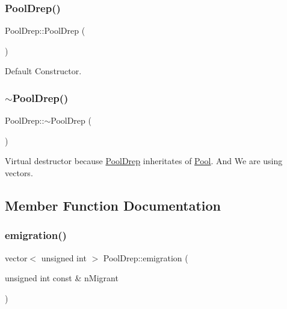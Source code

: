 \subsubsection{\texorpdfstring{Pool\+Drep()}{PoolDrep()}\hspace{0.1cm}{\footnotesize\ttfamily [2/2]}}
{\footnotesize\ttfamily Pool\+Drep\+::\+Pool\+Drep (\begin{DoxyParamCaption}{ }\end{DoxyParamCaption})\hspace{0.3cm}{\ttfamily [default]}}



Default Constructor. 

\hypertarget{class_pool_drep_a06de6a1171890c9902e1f5e20cd10523}{}\label{class_pool_drep_a06de6a1171890c9902e1f5e20cd10523} 
\subsubsection{\texorpdfstring{$\sim$\+Pool\+Drep()}{~PoolDrep()}}
{\footnotesize\ttfamily Pool\+Drep\+::$\sim$\+Pool\+Drep (\begin{DoxyParamCaption}{ }\end{DoxyParamCaption})\hspace{0.3cm}{\ttfamily [virtual]}}



Virtual destructor because \hyperlink{class_pool_drep}{Pool\+Drep} inheritates of \hyperlink{class_pool}{Pool}. And We are using vectors. 



\subsection{Member Function Documentation}
\hypertarget{class_pool_drep_a5d13aa16dfcf87d3496518a8df67db72}{}\label{class_pool_drep_a5d13aa16dfcf87d3496518a8df67db72} 
\subsubsection{\texorpdfstring{emigration()}{emigration()}}
{\footnotesize\ttfamily vector$<$ unsigned int $>$ Pool\+Drep\+::emigration (\begin{DoxyParamCaption}\item[{unsigned int const \&}]{n\+Migrant }\end{DoxyParamCaption})}



